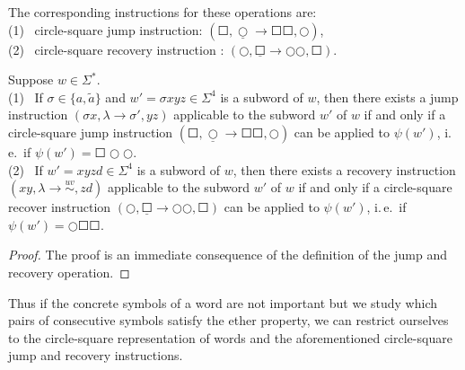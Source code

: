 The corresponding instructions for these operations are:\\
\indent \indent (1) \ circle-square jump instruction: $(\Square, \underline{\Circle} \to \Square \Square, \Circle)$,\\
\indent \indent (2) \ circle-square recovery instruction : $(\Circle, \underline{\Square} \to \Circle \Circle, \Square)$.

\begin{lemma}\label{lemma:circle-square-jump-and-recover}
Suppose $w \in \Sigma^*$.\\
\indent (1) \ If $\sigma \in \{a, \tilde{a}\}$ and $w' = \sigma x y z \in \Sigma^4$ is a subword of $w$, then there exists a jump instruction $(\sigma x, \lambda \to \sigma', yz)$ applicable to the subword $w'$ of $w$ if and only if a circle-square jump instruction $(\Square, \underline{\Circle} \to \Square \Square, \Circle)$ can be applied to $\psi(w')$, i.\,e.\ if $\psi(w') = \Square \Circle \Circle$.\\
\indent (2) \ If $w' = x y z d \in \Sigma^4$ is a subword of $w$, then there exists a recovery instruction $(xy, \lambda \to \stackrel{uv}{\sim}, zd)$ applicable to the subword $w'$ of $w$ if and only if a circle-square recover instruction $(\Circle, \underline{\Square} \to \Circle \Circle, \Square)$ can be applied to $\psi(w')$, i.\,e.\ if $\psi(w') = \Circle \Square \Square$.
\end{lemma}

\begin{proof}
The proof is an immediate consequence of the definition of the jump and recovery operation.
\end{proof}


Thus if the concrete symbols of a word are not important but we study which pairs of consecutive symbols satisfy the ether property, we can restrict ourselves to the circle-square representation of words and
the aforementioned circle-square jump and recovery instructions.

